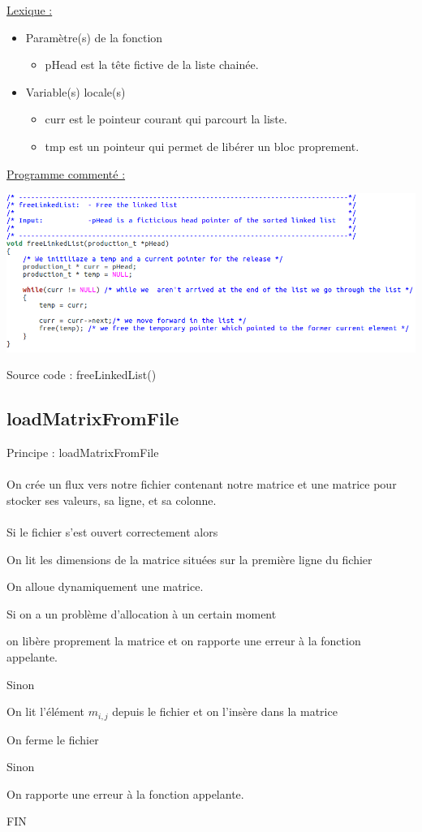 \documentclass[a4paper]{article}
\newcommand\tab[1][1cm]{\hspace*{#1}}
\begin{document}
\underline{Lexique :}
\begin{itemize}
\item Paramètre(s) de la fonction  
\begin{itemize}
\item pHead est la tête fictive de la liste chainée.
\end{itemize}
\item Variable(s) locale(s)
\begin{itemize}
\item curr est le pointeur courant qui parcourt la liste.
\item tmp est un pointeur qui permet de libérer un bloc proprement.
\end{itemize}
\end{itemize}

\underline{Programme commenté :}
\begin{center}
\includegraphics[scale=0.39]{freeLinkedList.png}

Source code : freeLinkedList()
\end{center}

\subsection{loadMatrixFromFile}
\begin{algorithm}
Principe : loadMatrixFromFile
\\
\\
\tab On crée un flux vers notre fichier contenant notre matrice et une matrice pour stocker ses
\tab valeurs, sa ligne, et sa colonne. 
\\
\\
\tab Si le fichier s'est ouvert correctement alors 

\tab \tab On lit les dimensions de la matrice situées sur la première ligne du fichier

\tab \tab On alloue dynamiquement une matrice.

\tab \tab Si on a un problème d'allocation à un certain moment 

\tab \tab \tab on libère proprement la matrice et on rapporte une erreur à la fonction appelante.

\tab \tab Sinon 

\tab \tab \tab On lit l'élément $m_{i,j}$ depuis le fichier et on l'insère dans la matrice 

\tab \tab  On ferme le fichier 

\tab Sinon  

\tab \tab On rapporte une erreur à la fonction appelante.

FIN
\end{algorithm}
\end{document}
